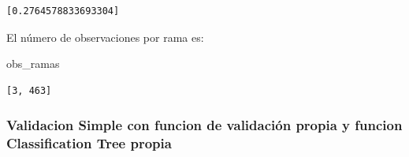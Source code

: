 \documentclass[
  11pt,
  a4paper,
]{article}
\newenvironment{Shaded}{\begin{snugshade}}{\end{snugshade}}
\newcommand{\NormalTok}[1]{#1}
\begin{document}
\begin{verbatim}
[0.2764578833693304]
\end{verbatim}

El número de observaciones por rama es:

\begin{Shaded}
\begin{Highlighting}[]
\NormalTok{obs\_ramas}
\end{Highlighting}
\end{Shaded}

\begin{verbatim}
[3, 463]
\end{verbatim}

\newpage

\hypertarget{validacion-simple-con-funcion-de-validaciuxf3n-propia-y-funcion-classification-tree-propia}{%
\subsubsection{Validacion Simple con funcion de validación propia y
funcion Classification Tree
propia}\label{validacion-simple-con-funcion-de-validaciuxf3n-propia-y-funcion-classification-tree-propia}}
\end{document}
